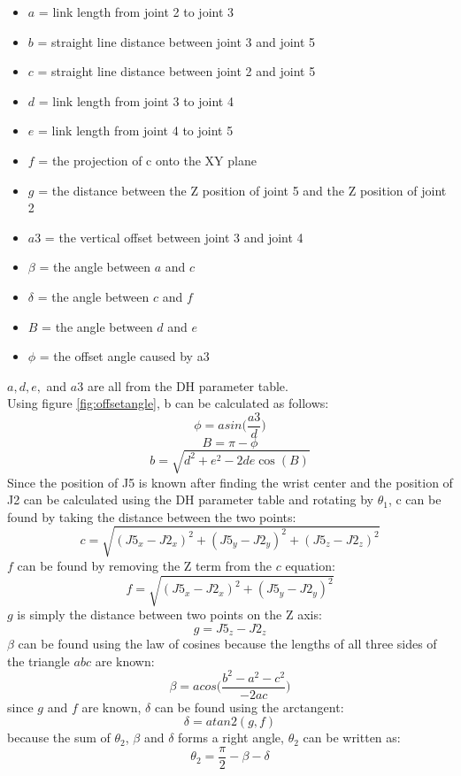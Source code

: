 \documentclass{article}
\begin{document}
\begin{itemize}
    \item $a$ = link length from joint 2 to joint 3
    \item $b$ = straight line distance between joint 3 and joint 5
    \item $c$ = straight line distance between joint 2 and joint 5
    \item $d$ = link length from joint 3 to joint 4
    \item $e$ = link length from joint 4 to joint 5
    \item $f$ = the projection of c onto the XY plane
    \item $g$ = the distance between the Z position of joint 5 and the Z position of joint 2
    \item $a3$ = the vertical offset between joint 3 and joint 4
    \item $\beta$ = the angle between $a$ and $c$
    \item $\delta$ = the angle between $c$ and $f$
    \item $B$ = the angle between $d$ and $e$
    \item $\phi$ = the offset angle caused by a3
\end{itemize}

$a, d, e,$ and $a3$ are all from the DH parameter table. \\
Using figure \ref{fig:offsetangle}, b can be calculated as follows:
\[\phi = asin\bigg(\frac{a3}{d}\bigg)\]
\[B = \pi - \phi\]
\[b = \sqrt{d^2 + e^2 -2de\cos(B)}\]
Since the position of J5 is known after finding the wrist center and the position of J2 can be calculated using the DH parameter table and rotating by $\theta _1$, c can be found by taking the distance between the two points:
\[c = \sqrt{(J5_x - J2_x)^2 + (J5_y - J2_y)^2 + (J5_z - J2_z)^2}\]
$f$ can be found by removing the Z term from the $c$ equation:
\[f = \sqrt{(J5_x - J2_x)^2 + (J5_y - J2_y)^2}\]
$g$ is simply the distance between two points on the Z axis:
\[g = J5_z - J2_z\]
$\beta$ can be found using the law of cosines because the lengths of all three sides of the triangle $abc$ are known:
\[\beta = acos\bigg(\frac{b^2 - a^2 - c^2}{-2ac}\bigg)\]
since $g$ and $f$ are known, $\delta$ can be found using the arctangent:
\[\delta = atan2(g,f)\]
because the sum of $\theta _2$, $\beta$ and $\delta$ forms a right angle, $\theta _2$ can be written as:
\[\theta _2 = \frac{\pi}{2} - \beta - \delta\]
\end{document}

